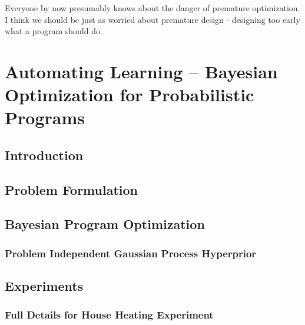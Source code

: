 
\begin{savequote}[8cm]
	Everyone by now presumably knows about the danger of premature optimization. 
	I think we should be just as worried about premature design - 
	designing too early what a program should do.
\end{savequote}

\chapter{Automating Learning -- Bayesian Optimization for Probabilistic Programs}
\label{chp:bopp}



\section{Introduction} 
\label{sec:IntroductionBOPP}



\section{Problem Formulation}
\label{sec:problem}



\section{Bayesian Program Optimization}
\label{sec:bopp}



\subsection{Problem Independent Gaussian Process Hyperprior}
\label{sec:app:hyperprior}



\section{Experiments}




\subsection{Full Details for House Heating Experiment}
\label{sec:app:heating}

